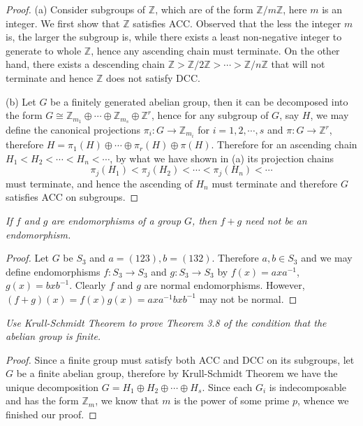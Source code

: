 \begin{proof}
(a) Consider subgroups of $\mathbb{Z}$, which are of the form $\mathbb{Z}/m\mathbb{Z}$, here $m$ is an integer. We first show that $\mathbb{Z}$ satisfies ACC. Observed that the less the integer $m$ is, the larger the subgroup is, while there exists a least non-negative integer to generate to whole $\mathbb{Z}$, hence any ascending chain must terminate. On the other hand, there exists a descending chain $\mathbb{Z}>\mathbb{Z}/2\mathbb{Z}>\cdots>\mathbb{Z}/n\mathbb{Z}$ that will not terminate and hence $\mathbb{Z}$ does not satisfy DCC.\par
(b) Let $G$ be a finitely generated abelian group, then it can be decomposed into the form $G\cong\mathbb{Z}_{m_1}\oplus\cdots\oplus\mathbb{Z}_{m_s}\oplus\mathbb{Z}^r$, hence for any subgroup of $G$, say $H$, we may define the canonical projections $\pi_i:G\to \mathbb{Z}_{m_i}$ for $i=1,2,\cdots,s$ and $\pi:G\to \mathbb{Z}^r$, therefore $H=\pi_1(H)\oplus\cdots\oplus\pi_r(H)\oplus\pi(H)$. Therefore for an ascending chain $H_1<H_2<\cdots<H_n<\cdots$, by what we have shown in (a) its projection chains 
$$\pi_j(H_1)<\pi_j(H_2)<\cdots<\pi_j(H_n)<\cdots$$
must terminate, and hence the ascending of $H_n$ must terminate and therefore $G$ satisfies ACC on subgroups.
\end{proof}
\begin{problem}\em
If $f$ and $g$ are endomorphisms of a group $G$, then $f+g$ need not be an endomorphism.
\end{problem}
\begin{proof}
Let $G$ be $S_3$ and $a=(123),b=(132)$. Therefore $a,b\in S_3$ and we may define endomorphisms $f:S_3\to S_3$ and $g:S_3\to S_3$ by $f(x)=axa^{-1}$, $g(x)=bxb^{-1}$. Clearly $f$ and $g$ are normal endomorphisms. However, $(f+g)(x)=f(x)g(x)=axa^{-1}bxb^{-1}$ may not be normal.
\end{proof}
\begin{problem}\em
Use Krull-Schmidt Theorem to prove Theorem 3.8 of the condition that the abelian group is finite.
\end{problem}
\begin{proof}
Since a finite group must satisfy both ACC and DCC on its subgroups, let $G$ be a finite abelian group, therefore by Krull-Schmidt Theorem we have the unique decomposition $G=H_1\oplus H_2\oplus\cdots\oplus H_s$. Since each $G_i$ is indecomposable and has the form $\mathbb{Z}_m$, we know that $m$ is the power of some prime $p$, whence we finished our proof.
\end{proof}
